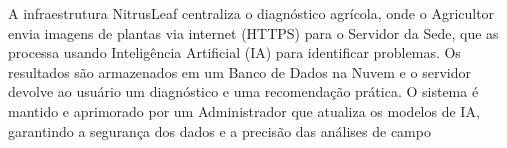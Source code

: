 

A infraestrutura NitrusLeaf centraliza o diagnóstico agrícola, onde o Agricultor envia imagens de 
plantas via internet (HTTPS) para o Servidor da Sede, que as processa usando Inteligência Artificial 
(IA) para identificar problemas. Os resultados são armazenados em um Banco de Dados na Nuvem e 
o servidor devolve ao usuário um diagnóstico e uma recomendação prática. O sistema é mantido e aprimorado
por um Administrador que atualiza os modelos de IA, garantindo a segurança dos dados e a precisão das 
análises de campo